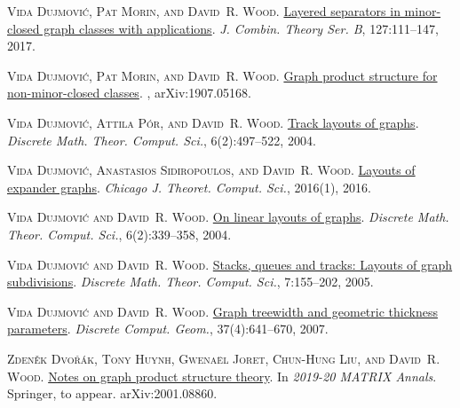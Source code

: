 \documentclass[kpfonts]{patmorin}
\begin{document}
	\textsc{Vida Dujmovi{\'c}, Pat Morin, and David~R. Wood}.
	\newblock \href{https://doi.org/10.1016/j.jctb.2017.05.006}{Layered separators
		in minor-closed graph classes with applications}.
	\newblock \emph{J. Combin. Theory Ser. B}, 127:111--147, 2017.
	
	\textsc{Vida Dujmovi{\'c}, Pat Morin, and David~R. Wood}.
	\newblock \href{http://arxiv.org/abs/1907.05168}{Graph product structure for
		non-minor-closed classes}.
	, arXiv:1907.05168.
	
	\textsc{Vida Dujmovi{\'c}, Attila P\'or, and David~R. Wood}.
	\newblock \href{http://dmtcs.episciences.org/315}{Track layouts of graphs}.
	\newblock \emph{Discrete Math. Theor. Comput. Sci.}, 6(2):497--522, 2004.
	
	\textsc{Vida Dujmovi{\'c}, Anastasios Sidiropoulos, and David~R. Wood}.
	\newblock \href{https://doi.org/10.4086/cjtcs.2016.001}{Layouts of expander
		graphs}.
	\newblock \emph{Chicago J. Theoret. Comput. Sci.}, 2016(1), 2016.
	
	\textsc{Vida Dujmovi{\'c} and David~R. Wood}.
	\newblock \href{http://dmtcs.episciences.org/317}{On linear layouts of graphs}.
	\newblock \emph{Discrete Math. Theor. Comput. Sci.}, 6(2):339--358, 2004.
	
	\textsc{Vida Dujmovi{\'c} and David~R. Wood}.
	\newblock \href{http://dmtcs.episciences.org/346}{Stacks, queues and tracks:
		Layouts of graph subdivisions}.
	\newblock \emph{Discrete Math. Theor. Comput. Sci.}, 7:155--202, 2005.
	
	\textsc{Vida Dujmovi{\'c} and David~R. Wood}.
	\newblock \href{https://doi.org/10.1007/s00454-007-1318-7}{Graph treewidth and
		geometric thickness parameters}.
	\newblock \emph{Discrete Comput. Geom.}, 37(4):641--670, 2007.
	
	\textsc{Zden{\v{e}}k Dvo{\v{r}}{\'a}k, Tony Huynh, Gwena\"el Joret, Chun-Hung
		Liu, and David~R. Wood}.
	\newblock \href{http://arxiv.org/abs/2001.08860}{Notes on graph product
		structure theory}.
	\newblock In \emph{2019-20 MATRIX Annals}. Springer, to appear.
	\newblock arXiv:2001.08860.
	
\end{document}
